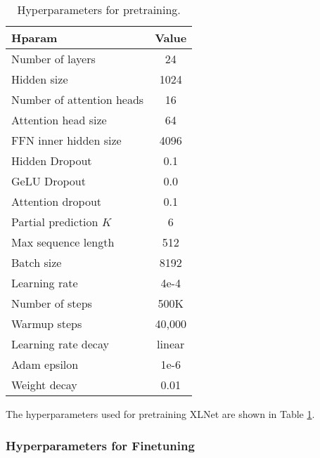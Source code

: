 \documentclass{article}
\begin{document}
\begin{table}[h!]
  \small
  \centering
  
  \begin{tabular}{lc}
    \toprule
    \bf Hparam & \bf Value \\
    \midrule
    Number of layers & 24 \\
    Hidden size & 1024 \\
    Number of attention heads & 16 \\
    Attention head size & 64 \\
    FFN inner hidden size & 4096 \\
    Hidden Dropout & 0.1 \\
    GeLU Dropout & 0.0 \\
    Attention dropout & 0.1 \\
    Partial prediction $K$ & 6 \\
    Max sequence length & 512 \\
    Batch size & 8192 \\
    Learning rate & 4e-4 \\
    Number of steps & 500K \\
    Warmup steps & 40,000 \\
    Learning rate decay & linear \\
    Adam epsilon  & 1e-6 \\
    Weight decay & 0.01 \\
    \bottomrule
  \end{tabular}
  \caption{\small
    Hyperparameters for pretraining.
  }
  \label{tab:hp-pretrain}
  \vspace{-1em}
\end{table}

The hyperparameters used for pretraining XLNet are shown in Table \ref{tab:hp-pretrain}.

\subsubsection{Hyperparameters for Finetuning}
\end{document}
